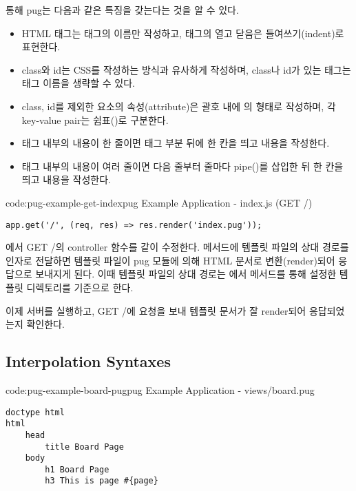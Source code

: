 \를 통해 pug는 다음과 같은 특징을 갖는다는 것을 알 수 있다.

\begin{itemize}
    \item HTML 태그는 태그의 이름만 작성하고, 태그의 열고 닫음은 들여쓰기(indent)로 표현한다.
    \item class와 id는 CSS를 작성하는 방식과 유사하게 작성하며, class나 id가 있는  태그는 태그 이름을 생략할 수 있다.
    \item class, id를 제외한 요소의 속성(attribute)은 괄호 내에 의 형태로 작성하며, 각 key-value pair는 쉼표(\cd{,})로 구분한다.
    \item 태그 내부의 내용이 한 줄이면 태그 부분 뒤에 한 칸을 띄고 내용을 작성한다.
    \item 태그 내부의 내용이 여러 줄이면 다음 줄부터 줄마다 pipe(\cd{|})를 삽입한 뒤 한 칸을 띄고 내용을 작성한다.
\end{itemize}

\begin{codeenv}{code:pug-example-get-index}{pug Example Application - index.js (GET /)}\begin{verbatim}
app.get('/', (req, res) => res.render('index.pug'));
\end{verbatim}
\end{codeenv}

에서 GET /의 controller 함수를 \와 같이 수정한다.  메서드에 템플릿 파일의 상대 경로를 인자로 전달하면 템플릿 파일이 pug 모듈에 의해 HTML 문서로 변환(render)되어 응답으로 보내지게 된다. 이때 템플릿 파일의 상대 경로는 에서  메서드를 통해 설정한 템플릿 디렉토리를 기준으로 한다.

이제 서버를 실행하고, GET /에 요청을 보내 템플릿 문서가 잘 render되어 응답되었는지 확인한다.

\subsection*{Interpolation Syntaxes}

\begin{codeenv}{code:pug-example-board-pug}{pug Example Application - views/board.pug}\begin{verbatim}
doctype html
html
    head
        title Board Page
    body
        h1 Board Page
        h3 This is page #{page}
\end{verbatim}
\end{codeenv}

